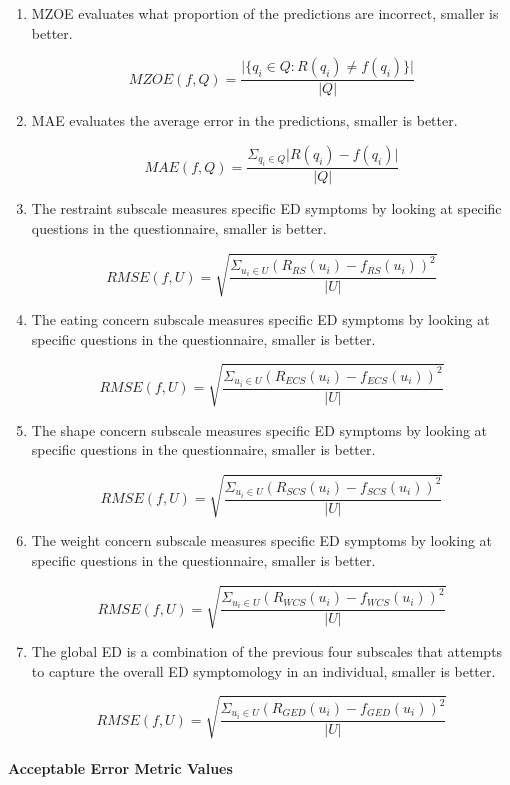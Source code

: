 \documentclass[12pt, titlepage]{article}
\newcommand{\myparagraph}[1]{\paragraph{#1}\mbox{}\\}
\begin{document}
\begin{enumerate}

\item MZOE evaluates what proportion of the predictions are incorrect, smaller is better.

$$MZOE(f,Q) = \frac{\vert\{q_i \in Q : R(q_i) \neq f(q_i)\}\vert}{\vert Q \vert}$$

\item MAE evaluates the average error in the predictions, smaller is better.

$$MAE(f,Q) = \frac{\Sigma_{q_i \in Q}\vert R(q_i) - f(q_i)\vert}{\vert Q \vert}$$

\item The restraint subscale measures specific ED symptoms by looking at specific questions in the questionnaire, smaller is better.

$$RMSE(f,U) = \sqrt{\frac{\Sigma_{u_i \in U}(R_{RS}(u_i) - f_{RS}(u_i))^2}{\vert U \vert}}$$

\item The eating concern subscale measures specific ED symptoms by looking at specific questions in the questionnaire, smaller is better.

$$RMSE(f,U) = \sqrt{\frac{\Sigma_{u_i \in U}(R_{ECS}(u_i) - f_{ECS}(u_i))^2}{\vert U \vert}}$$

\item The shape concern subscale measures specific ED symptoms by looking at specific questions in the questionnaire, smaller is better.

$$RMSE(f,U) = \sqrt{\frac{\Sigma_{u_i \in U}(R_{SCS}(u_i) - f_{SCS}(u_i))^2}{\vert U \vert}}$$

\item The weight concern subscale measures specific ED symptoms by looking at specific questions in the questionnaire, smaller is better.

$$RMSE(f,U) = \sqrt{\frac{\Sigma_{u_i \in U}(R_{WCS}(u_i) - f_{WCS}(u_i))^2}{\vert U \vert}}$$

\item The global ED is a combination of the previous four subscales that attempts to capture the overall ED symptomology in an individual, smaller is better.

$$RMSE(f,U) = \sqrt{\frac{\Sigma_{u_i \in U}(R_{GED}(u_i) - f_{GED}(u_i))^2}{\vert U \vert}}$$

\end{enumerate}

\myparagraph{Acceptable Error Metric Values} \label{bounds}
\end{document}
